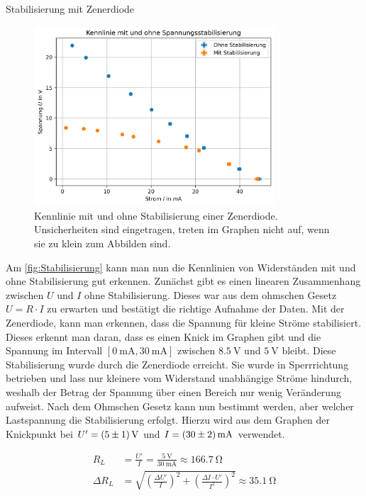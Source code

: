 \documentclass{article}
\theoremstyle{definition}
\begin{document}
\begin{aufgabe}{Stabilisierung mit Zenerdiode}
\begin{figure}[H]
             \centering
             \includegraphics[width=0.8\textwidth]{figs/2.5.png}
             \caption{Kennlinie mit und ohne Stabilisierung einer Zenerdiode. Unsicherheiten sind eingetragen, treten im Graphen nicht auf, wenn sie zu klein zum Abbilden sind.}
             \label{fig:Stabilisierung}
         \end{figure}
         
         
Am \autoref{fig:Stabilisierung} kann man nun die Kennlinien von Widerständen mit und ohne Stabilisierung gut erkennen. Zunächst gibt es einen linearen Zusammenhang zwischen $U$ und $I$ ohne Stabilisierung. Dieses war aus dem ohmschen Gesetz $U= R \cdot I$ zu erwarten und bestätigt die richtige Aufnahme der Daten. Mit der Zenerdiode, kann man erkennen, dass die Spannung für kleine Ströme stabilisiert. Dieses erkennt man daran, dass es einen Knick im Graphen gibt und die Spannung im Intervall $[\SI{0}{\milli \ampere}, \SI{30}{\milli \ampere}]$ zwischen $\SI{8.5}{\volt}$ und $\SI{5}{\volt}$ bleibt. Diese Stabilisierung wurde durch die Zenerdiode erreicht. Sie wurde in Sperrrichtung betrieben und lass nur kleinere vom Widerstand unabhängige Ströme hindurch, weshalb der Betrag der Spannung über einen Bereich nur wenig Veränderung aufweist. Nach dem Ohmschen Gesetz kann nun bestimmt werden, aber welcher Lastspannung die Stabilisierung erfolgt. Hierzu wird aus dem Graphen der Knickpunkt bei $U' = \SI{5\pm 1}{\volt}$ und $I = \SI{30 \pm 2}{\milli \ampere}$ verwendet.

\begin{align}
    R_L &= \frac{U'}{I} = \frac{\SI{5}{\volt}}{\SI{30}{\milli \ampere}} \approx \SI{166.7}{\ohm} \\
    \Delta R_L &= \sqrt{\left( \frac{\Delta U'}{I}\right)^2 + \left( \frac{\Delta I \cdot U'}{I^2}\right)^2} \approx \SI{35.1}{\ohm}
\end{align}



\end{aufgabe}
\end{document}
